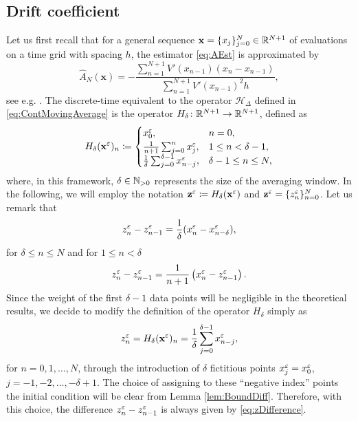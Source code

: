 \documentclass[10pt]{article}
\begin{document}
\subsection{Drift coefficient}
Let us first recall that for a general sequence $\mathbf x = \{x_j\}_{j=0}^N \in \mathbb{R}^{N+1}$ of evaluations on a time grid with spacing $h$, the estimator \eqref{eq:AEst} is approximated by
\begin{equation}\label{eq:AEstDiscrete}
	\widehat A_N(\mathbf x) = -\frac{\sum_{n=1}^{N+1} V'(x_{n-1})(x_n - x_{n-1})}{\sum_{n=1}^{N+1}V'(x_{n-1})^2 h},
\end{equation}
see e.g. \cite{PaS07}. The discrete-time equivalent to the operator $\mathcal H_\Delta$ defined in \eqref{eq:ContMovingAverage} is the operator $H_\delta\colon \mathbb{R}^{N+1} \to \mathbb{R}^{N+1}$, defined as
\begin{equation}
	H_\delta (\mathbf x^\varepsilon)_n \coloneqq 
	\begin{cases}
		x^\varepsilon_0, &n = 0,\\
		\frac1{n+1} \sum_{j=0}^n x^\varepsilon_j, &1 \leq n < \delta-1,\\
		\frac1\delta \sum_{j=0}^{\delta-1} x^\varepsilon_{n-j}, &\delta - 1 \leq n \leq N,
	\end{cases} 
\end{equation}
where, in this framework, $\delta \in \mathbb{N}_{>0}$ represents the size of the averaging window. In the following, we will employ the notation $\mathbf z^\varepsilon \coloneqq H_\delta(\mathbf x^\varepsilon)$ and $\mathbf z^\varepsilon=\{z^\varepsilon_n\}_{n=0}^{N}$. Let us remark that 
\begin{equation}\label{eq:zDifference}
	z^\varepsilon_n - z^\varepsilon_{n-1} = \frac1\delta(x^\varepsilon_n - x^\varepsilon_{n-\delta}),
\end{equation}
for $\delta  \leq n \leq N$ and for $1 \leq n < \delta$
\begin{equation}
	z^\varepsilon_n - z^\varepsilon_{n-1} = \frac1{n+1} \left(x_n^\varepsilon - z^\varepsilon_{n-1}\right).
\end{equation}
Since the weight of the first $\delta-1$ data points will be negligible in the theoretical results, we decide to modify the definition of the operator $H_\delta$ simply as
\begin{equation}
	z^\varepsilon_n = H_\delta (\mathbf x^\varepsilon)_n = \frac1\delta \sum_{j=0}^{\delta-1} x^\varepsilon_{n-j},
\end{equation}
for $n = 0, 1, \ldots, N$, through the introduction of $\delta$ fictitious points $x^\varepsilon_j = x^\varepsilon_0$, $j = -1, -2, \ldots, -\delta+1$. The choice of assigning to these ``negative index'' points the initial condition will be clear from Lemma \ref{lem:BoundDiff}. Therefore, with this choice, the difference $z_n^\varepsilon - z_{n-1}^\varepsilon$ is always given by \eqref{eq:zDifference}.
\end{document}
